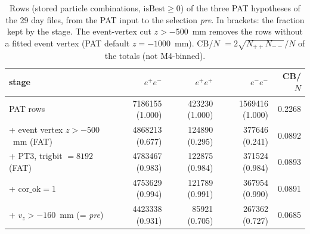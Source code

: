 \begin{table}[H]
\centering
\scriptsize
\caption{Rows (stored particle combinations, $\mathrm{isBest}\ge0$) of the three PAT hypotheses of the 29 day files, from the PAT input to the selection \emph{pre}. In brackets: the fraction kept by the stage. The event-vertex cut $z>-500$~mm removes the rows without a fitted event vertex (PAT default $z=-1000$~mm). CB/$N$ $=2\sqrt{N_{++}N_{--}}/N$ of the totals (not M4-binned).}
\label{tab:spec_cutflow}
\begin{tabular}{lrrrr}
\toprule
stage & $e^+e^-$ & $e^+e^+$ & $e^-e^-$ & CB/$N$ \\
\midrule
PAT rows & 7186155 (1.000) & 423230 (1.000) & 1569416 (1.000) & 0.2268 \\
+ event vertex $z>-500$~mm (FAT) & 4868213 (0.677) & 124890 (0.295) & 377646 (0.241) & 0.0892 \\
+ PT3, trigbit $=8192$ (FAT) & 4783467 (0.983) & 122875 (0.984) & 371524 (0.984) & 0.0893 \\
+ $\mathrm{cor\_ok}=1$ & 4753629 (0.994) & 121789 (0.991) & 367954 (0.990) & 0.0891 \\
+ $v_z>-160$~mm (= \emph{pre}) & 4423338 (0.931) & 85921 (0.705) & 267362 (0.727) & 0.0685 \\
\bottomrule
\end{tabular}
\end{table}
